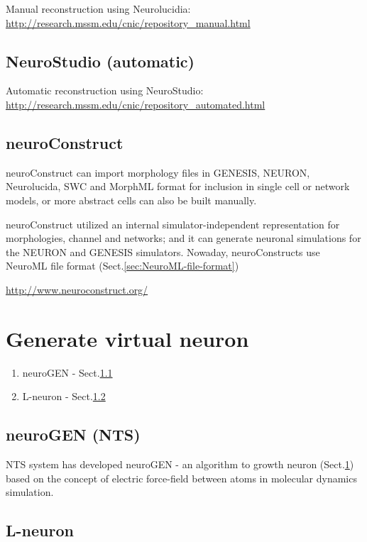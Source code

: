 Manual reconstruction using Neurolucidia:
\url{http://research.mssm.edu/cnic/repository_manual.html}

\subsection{NeuroStudio (automatic)}
\label{sec:NeuroStudio}

Automatic reconstruction using NeuroStudio:
\url{http://research.mssm.edu/cnic/repository_automated.html}

\subsection{neuroConstruct}
\label{sec:neuroConstruct}

neuroConstruct can import morphology files in GENESIS, NEURON, Neurolucida, SWC
and MorphML format for inclusion in single cell or network models, or more
abstract cells can also be built manually.

neuroConstruct utilized an internal simulator-independent representation for
morphologies, channel and networks; and it can generate neuronal simulations for
the NEURON and GENESIS simulators. Nowaday, neuroConstructs use NeuroML file
format (Sect.\ref{sec:NeuroML-file-format})

\url{http://www.neuroconstruct.org/}

\section{Generate virtual neuron}
\label{sec:growth-neuron}

\begin{enumerate}
  \item neuroGEN - Sect.\ref{sec:neuroGEN}
  
  \item L-neuron - Sect.\ref{sec:L-neuron}
\end{enumerate}

\subsection{neuroGEN (NTS)}
\label{sec:neuroGEN}

NTS system has developed neuroGEN - an algorithm to growth neuron
(Sect.\ref{sec:growth-neuron}) based on the concept of electric force-field
between atoms in molecular dynamics simulation.


\subsection{L-neuron}
\label{sec:L-neuron}

